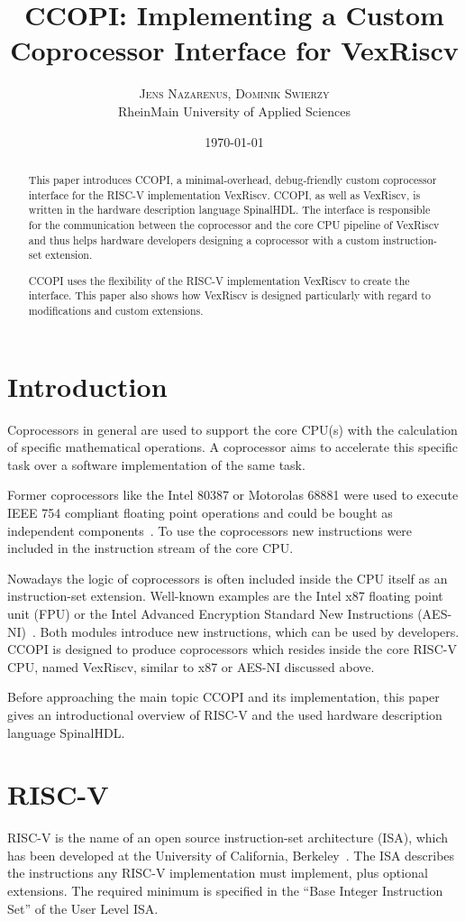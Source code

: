 \documentclass[twoside,twocolumn]{article}
\title{\vspace{-7mm}%
	\fontsize{24pt}{10pt}\selectfont
	\textbf{CCOPI: Implementing a Custom Coprocessor Interface for
    VexRiscv}
	}
\author{%
	\large
	\textsc{Jens Nazarenus, Dominik Swierzy} \\[2mm]
	\normalsize	RheinMain University of Applied Sciences \\
    \normalsize	\code{\{jens.nazarenus, dominik.swierzy\}@hs-rm.de}
	}
\date{\today}
\begin{document}
\maketitle

\begin{abstract}
\noindent This paper introduces CCOPI, a minimal-overhead,
    debug-friendly custom coprocessor interface for the
RISC-V implementation VexRiscv. CCOPI, as well as VexRiscv, is written in
the hardware description language SpinalHDL. The interface is responsible 
for the communication between the coprocessor and the core CPU pipeline of 
VexRiscv and thus helps hardware developers designing  
a coprocessor with a custom instruction-set extension.

CCOPI uses the flexibility of the RISC-V implementation VexRiscv to create 
the interface. This paper also shows how VexRiscv is designed particularly with 
regard to modifications and custom extensions. 
\end{abstract}

\section{Introduction}
Coprocessors in general are used to support the core CPU(s) with the
calculation of specific mathematical operations. A coprocessor aims to
accelerate this specific task over a software implementation of the same
task.

Former coprocessors like the Intel 80387 or Motorolas 68881 were used to
execute IEEE 754 compliant floating point operations and could be
bought as independent components~\cite{motorola, intel198780387}. To use the coprocessors new
instructions were included in the instruction stream of the core CPU.

Nowadays the logic of coprocessors is often included inside the CPU
itself as an instruction-set extension. Well-known examples are the
Intel\textregistered{} x87 
floating point unit (FPU) or the Intel\textregistered{} Advanced Encryption Standard New 
Instructions (AES-NI)~\cite{x87, aesni}. Both modules introduce new
instructions, which can
be used by developers.
CCOPI is designed to produce coprocessors which resides inside the core
RISC-V CPU, named VexRiscv, similar to x87 or AES-NI discussed above.

Before approaching the main topic CCOPI and its implementation, this paper
gives an introductional overview of RISC-V and the used
hardware description language SpinalHDL.
\section{RISC-V}
RISC-V is the name of an open source instruction-set architecture (ISA),
which has been developed at the University of California,
Berkeley~\cite{riscv}.
The ISA describes the instructions any RISC-V implementation must
implement, plus optional extensions. The required minimum is specified in
the ``Base Integer Instruction Set'' of the User Level ISA.
\end{document}

